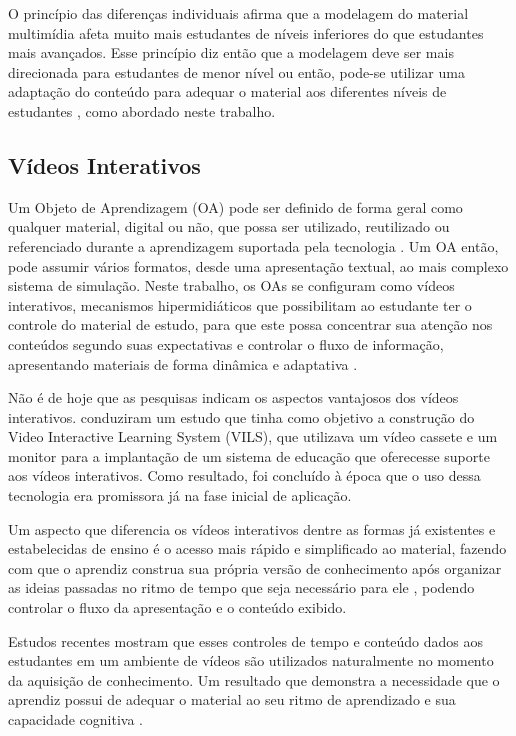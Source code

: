 O princípio das diferenças individuais afirma que a modelagem do material multimídia afeta muito mais estudantes de níveis inferiores do que estudantes mais avançados. Esse princípio diz então que a modelagem deve ser mais direcionada para estudantes de menor nível \cite{mayer2014} ou então, pode-se utilizar uma adaptação do conteúdo para adequar o material aos diferentes níveis de estudantes \cite{fragelli2010, brusilovsky1996, brusilovsky1994}, como abordado neste trabalho.

\subsection{Vídeos Interativos}

Um Objeto de Aprendizagem (OA) pode ser definido de forma geral como qualquer material, digital ou não, que possa ser utilizado, reutilizado ou referenciado durante a aprendizagem suportada pela tecnologia \cite{fragelli2010}. Um OA então, pode assumir vários formatos, desde uma apresentação textual, ao mais complexo sistema de simulação. Neste trabalho, os OAs se configuram como vídeos interativos, mecanismos hipermidiáticos que possibilitam ao estudante ter o controle do material de estudo, para que este possa concentrar sua atenção nos conteúdos segundo suas expectativas e controlar o fluxo de informação, apresentando materiais de forma dinâmica e adaptativa \cite{sturzbecher2013}. 

Não é de hoje que as pesquisas indicam os aspectos vantajosos dos vídeos interativos.  conduziram um estudo que tinha como objetivo a construção do Video Interactive Learning System (VILS), que utilizava um vídeo cassete e um monitor para a implantação de um sistema de educação que oferecesse suporte aos vídeos interativos. Como resultado, foi concluído à época que o uso dessa tecnologia era promissora já na fase inicial de aplicação.

Um aspecto que diferencia os vídeos interativos dentre as formas já existentes e estabelecidas de ensino é o acesso mais rápido e simplificado ao material, fazendo com que o aprendiz construa sua própria versão de conhecimento após organizar as ideias passadas no ritmo de tempo que seja necessário para ele \cite{sturzbecher2013, zhang2005}, podendo controlar o fluxo da apresentação e o conteúdo exibido.

Estudos recentes mostram que esses controles de tempo e conteúdo dados aos estudantes em um ambiente de vídeos são utilizados naturalmente no momento da aquisição de conhecimento. Um resultado que demonstra a necessidade que o aprendiz possui de adequar o material ao seu ritmo de aprendizado e sua capacidade cognitiva \cite{chandler2004, mayer2001}.

